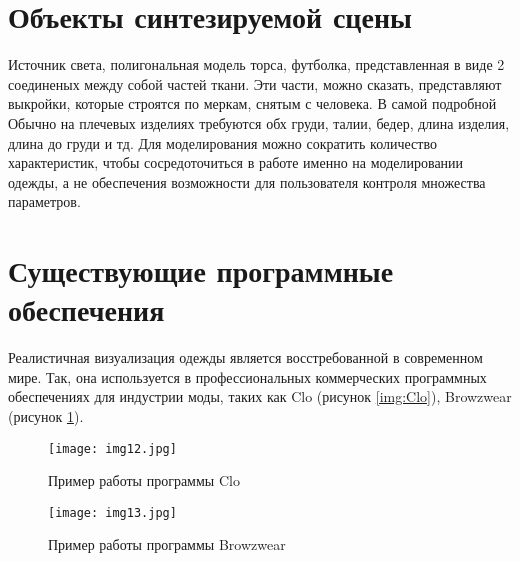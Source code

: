 \section{Объекты синтезируемой сцены}

Источник света, полигональная модель торса, футболка, представленная в виде 2
соединеных между собой частей ткани. Эти части, можно сказать, представляют
выкройки, которые строятся по меркам, снятым с человека. В самой подробной
Обычно на плечевых изделиях требуются обх груди, талии, бедер, длина изделия,
длина до груди и тд.  Для моделирования можно сократить количество
характеристик, чтобы сосредоточиться в работе именно на моделировании одежды, а
не обеспечения возможности для пользователя контроля множества параметров.



\section{Существующие программные обеспечения}

Реалистичная визуализация одежды является восстребованной в современном мире.
Так, она используется в профессиональных коммерческих программных обеспечениях
для индустрии моды, таких как Clo\cite{site01} (рисунок \ref{img:Clo}),
Browzwear\cite{site02} (рисунок \ref{img:Browzwear}).

\begin{figure}[ht!]
\begin{center}
    \begin{minipage}[h]{0.4\linewidth}
        \begin{center}
            \texttt{[image: img12.jpg]}
            \caption{Пример работы программы Clo}
            \label{img:Clo}
        \end{center}
    \end{minipage}
    \hspace{2ex}
    \begin{minipage}[h]{0.4\linewidth}
        \begin{center}
            \texttt{[image: img13.jpg]}
            \caption{Пример работы программы Browzwear}
            \label{img:Browzwear}
        \end{center}
    \end{minipage}
\end{center}
\end{figure}

